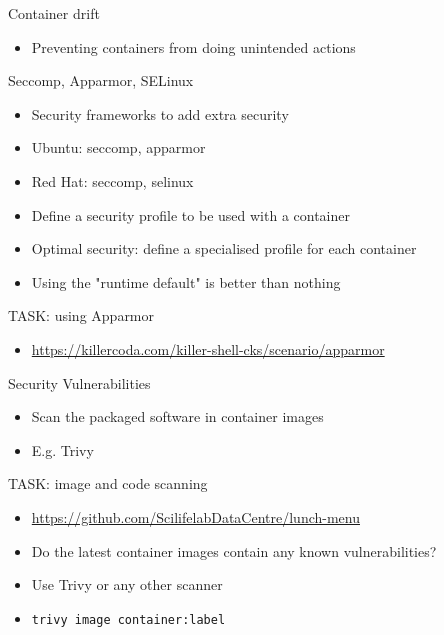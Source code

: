 \documentclass{dcpresentation}
\begin{document}

\begin{frame}{Container drift}
 \begin{itemize}
  \item Preventing containers from doing unintended actions
 \end{itemize}
\end{frame}

\begin{frame}{Seccomp, Apparmor, SELinux}
  \begin{itemize}
  \item Security frameworks to add extra security
  \item Ubuntu: seccomp, apparmor
  \item Red Hat: seccomp, selinux
  \item Define a security profile to be used with a container
  \item Optimal security: define a specialised profile for each container
  \item Using the "runtime default" is better than nothing
  \end{itemize}
\end{frame}

\begin{frame}{TASK: using Apparmor}
 \begin{itemize}
  \item \url{https://killercoda.com/killer-shell-cks/scenario/apparmor}
 \end{itemize}
\end{frame}


\begin{frame}{Security Vulnerabilities}
  \begin{itemize}
  \item Scan the packaged software in container images
  \item E.g. Trivy
  \end{itemize}
\end{frame}


\begin{frame}{TASK: image and code scanning}
  \begin{itemize}
  \item \url{https://github.com/ScilifelabDataCentre/lunch-menu}
  \item Do the latest container images contain any known vulnerabilities?
  \item Use Trivy or any other scanner
  \item \texttt{trivy image container:label}
  \end{itemize}
\end{frame}
\end{document}
